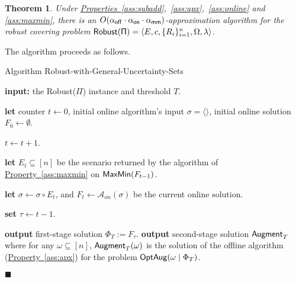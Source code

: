 \documentclass[11pt,letterpaper]{article}
\newcommand{\lref}[2][]{\hyperref[#2]{#1~\ref*{#2}}}
\newtheorem{theorem}{Theorem}[section]
\newenvironment{proof}{

\noindent{\bf Proof:}} {\hfill$\blacksquare$


}
\def\a{\ensuremath{\mathcal{A}}\xspace}
\def\cov{\ensuremath{\Pi}\xspace}
\def\rcov{{\sf Robust(\cov)}\xspace}
\def\mm{{\sf MaxMin}\xspace}
\def\fst{\ensuremath {\Phi_T}\xspace}
\def\snd{\ensuremath {{\sf Augment}_T}\xspace}
\newcommand{\sse}{\subseteq}
\newcommand{\offline}{\alpha_{\sf off}}
\newcommand{\online}{\alpha_{\sf on}}
\newcommand{\optaug}{{\sf OptAug}}
\begin{document}
\begin{theorem}\label{th:gen-p-sets}
Under \lref[Properties]{ass:subadd},~\ref{ass:apx},~\ref{ass:online} and \ref{ass:maxmin}, there is an
$O(\offline\cdot\online\cdot\mapx)$-approximation algorithm for the robust covering problem $\rcov = \langle E,c,
\{R_i\}_{i=1}^n, \Omega,\lambda \rangle$.
\end{theorem}
\begin{proof}
The algorithm proceeds as follows.
\begin{algorithm}
\caption{Algorithm Robust-with-General-Uncertainty-Sets}
  \begin{algorithmic}[1]
\STATE \textbf{input:} the \rcov instance and threshold $T$.

    \STATE \textbf{let} counter $t\leftarrow 0$, initial online
    algorithm's input $\sigma = \langle\rangle$, initial online solution
    $F_0\leftarrow \emptyset$.

    \REPEAT

       $t\leftarrow t+1$.

    \STATE \label{step:gen:1} \textbf{let} $E_t\sse [n]$ be the scenario returned by
    the algorithm of \lref[Property]{ass:maxmin} on $\mm(F_{t-1})$.

    \STATE \label{step:gen:2} \textbf{let} $\sigma \gets \sigma \circ E_t$, and $F_t \gets
    \a_{on}(\sigma)$ be the current online solution.

    \UNTIL{$c(F_t) - c(F_{t-1}) \le 2\online \cdot T$} \label{step:gen:3}

\STATE  \textbf{set} $\tau \leftarrow t-1$.

    \STATE \textbf{output} first-stage solution $\fst:=F_{\tau}$.
    \STATE \textbf{output} second-stage solution $\snd$ where for any $\omega\sse[n]$, $\snd(\omega)$ is the solution of
  the offline algorithm (\lref[Property]{ass:apx}) for the problem $\optaug(\omega\mid \fst)$.
  \end{algorithmic}
\end{algorithm}



\end{proof}
\end{document}
